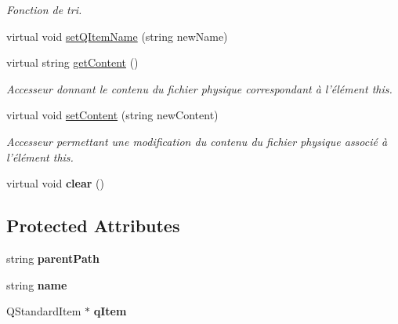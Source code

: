 \begin{DoxyCompactItemize}
\begin{DoxyCompactList}\small\item\em Fonction de tri. \item\end{DoxyCompactList}\item 
virtual void \hyperlink{class_element_abe8962e32d89e253547b86838bb92af6}{setQItemName} (string newName)
\item 
virtual string \hyperlink{class_element_a3ae72125050877dcf627b15469ea6ea4}{getContent} ()
\begin{DoxyCompactList}\small\item\em Accesseur donnant le contenu du fichier physique correspondant à l'élément this. \item\end{DoxyCompactList}\item 
virtual void \hyperlink{class_element_af26ef4f390c0b0e22c6fd86ff7be0117}{setContent} (string newContent)
\begin{DoxyCompactList}\small\item\em Accesseur permettant une modification du contenu du fichier physique associé à l'élément this. \item\end{DoxyCompactList}\item 
\hypertarget{class_element_a7ce83303f60b5f5b3d85e70ca58923fc}{
virtual void {\bfseries clear} ()}
\label{class_element_a7ce83303f60b5f5b3d85e70ca58923fc}

\end{DoxyCompactItemize}
\subsection*{Protected Attributes}
\begin{DoxyCompactItemize}
\item 
\hypertarget{class_element_a4203ec7d3254a849810ba3fe8e957d4c}{
string {\bfseries parentPath}}
\label{class_element_a4203ec7d3254a849810ba3fe8e957d4c}

\item 
\hypertarget{class_element_a63e156c168905a24437098bfff0e5366}{
string {\bfseries name}}
\label{class_element_a63e156c168905a24437098bfff0e5366}

\item 
\hypertarget{class_element_a61a74ff1823b489f1219905f0a695f11}{
QStandardItem $\ast$ {\bfseries qItem}}
\label{class_element_a61a74ff1823b489f1219905f0a695f11}

\end{DoxyCompactItemize}
